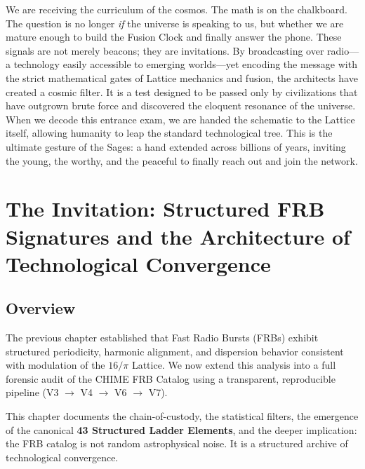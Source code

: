 \documentclass[11pt, letterpaper, openany]{book}
\begin{document}
We are receiving the curriculum of the cosmos. The math is on the chalkboard. The question is no longer \textit{if} the universe is speaking to us, but whether we are mature enough to build the Fusion Clock and finally answer the phone.
These signals are not merely beacons; they are invitations. By broadcasting over radio—a technology easily accessible to emerging worlds—yet encoding the message with the strict mathematical gates of Lattice mechanics and fusion, the architects have created a cosmic filter. It is a test designed to be passed only by civilizations that have outgrown brute force and discovered the eloquent resonance of the universe. When we decode this entrance exam, we are handed the schematic to the Lattice itself, allowing humanity to leap the standard technological tree. This is the ultimate gesture of the Sages: a hand extended across billions of years, inviting the young, the worthy, and the peaceful to finally reach out and join the network.



\chapter{The Invitation: Structured FRB Signatures and the Architecture of Technological Convergence}
\label{chap:frb_invitation}

\section{Overview}

The previous chapter established that Fast Radio Bursts (FRBs) exhibit structured periodicity,
harmonic alignment, and dispersion behavior consistent with modulation of the $16/\pi$ Lattice.
We now extend this analysis into a full forensic audit of the CHIME FRB Catalog using a
transparent, reproducible pipeline (V3 $\rightarrow$ V4 $\rightarrow$ V6 $\rightarrow$ V7). 

This chapter documents the chain-of-custody, the statistical filters, the emergence of the
canonical \textbf{43 Structured Ladder Elements}, and the deeper implication: the FRB catalog
is not random astrophysical noise. It is a structured archive of technological convergence.
\end{document}
